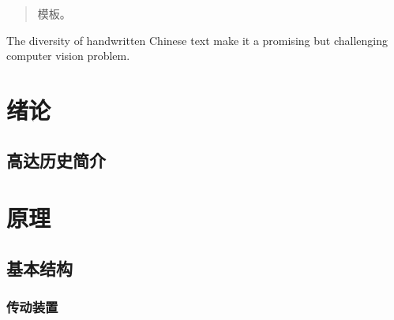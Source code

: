 \documentclass{njuthesis}
\begin{document}
\maketitle


\begin{abstract}
    模板。
    \keywords{}
\end{abstract}

\begin{englishabstract}
    The diversity of handwritten Chinese text make it a promising but challenging computer vision problem.
  \end{englishabstract}

\mainmatter

\chapter{绪论}
    \section{高达历史简介}
\chapter{原理}
    \section{基本结构}
    \subsection{传动装置}
\end{document}
